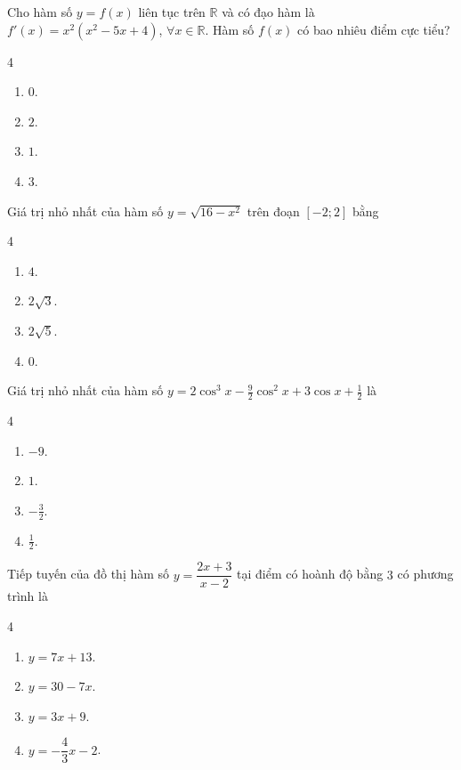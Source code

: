 \begin{baitap}
	Cho hàm số $y = f(x)$ liên tục trên $\mathbb{R}$ và có đạo hàm là $f'(x) = x^2 (x^2 - 5x + 4)$, $\forall x \in \mathbb{R}$. Hàm số $f(x)$ có bao nhiêu điểm cực tiểu?
	\begin{multicols}{4}
		\begin{enumerate}[\quad \bf A.]
			\item $0$.
			\item $2$.
			\item $1$.
			\item $3$.
		\end{enumerate}
	\end{multicols}
\end{baitap}

\begin{baitap}
	Giá trị nhỏ nhất của hàm số $y = \sqrt{16 - x^2}$ trên đoạn $[-2; 2]$ bằng
	\begin{multicols}{4}
		\begin{enumerate}[\quad \bf A.]
			\item $4$.
			\item $2\sqrt{3}$.
			\item $2\sqrt{5}$.
			\item $0$.
		\end{enumerate}
	\end{multicols}
\end{baitap}
\begin{baitap}
	Giá trị nhỏ nhất của hàm số $y = 2 \cos^3 x - \frac{9}{2} \cos^2 x + 3 \cos x + \frac{1}{2}$ là
	\begin{multicols}{4}
		\begin{enumerate}[\quad \bf A.]
			\item $-9$.
			\item $1$.
			\item $-\frac{3}{2}$.
			\item $\frac{1}{2}$.
		\end{enumerate}
	\end{multicols}
\end{baitap}

\begin{baitap}
	Tiếp tuyến của đồ thị hàm số $y = \dfrac{2x + 3}{x - 2}$ tại điểm có hoành độ bằng $3$ có phương trình là
	\begin{multicols}{4}
		\begin{enumerate}[\quad \bf A.]
			\item $y = 7x + 13$.
			\item $y = 30 - 7x$.
			\item $y = 3x + 9$.
			\item $y = -\dfrac{4}{3}x - 2$.
		\end{enumerate}
	\end{multicols}
\end{baitap}

